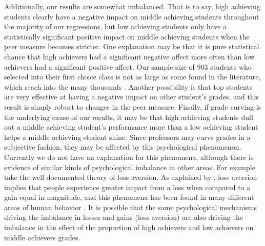 Additionally, our results are somewhat imbalanced. That is to say, high achieving students clearly have a negative impact on middle achieving students throughout the majority of our regressions, but low achieving students only have a statistically significant positive impact on middle achieving students when the peer measure becomes stricter. 
One explanation may be that it is pure statistical chance that high achievers had a significant negative affect more often than low achievers had a significant positive affect. 
Our sample size of 903 students who selected into their first choice class is not as large as some found in the literature, which reach into the many thousands \citep{kang2007classroom,lavy2012good}. 
Another possibility is that top students are very effective at having a negative impact on other student's grades, and this result is simply robust to changes in the peer measure. 
Finally, if grade curving is the underlying cause of our results, it may be that high achieving students dull out a middle achieving student's performance more than a low achieving student helps a middle achieving student shine.
Since professors may curve grades in a subjective fashion, they may be affected by this psychological phenomenon. 
Currently we do not have an explanation for this phenomena, although there is evidence of similar kinds of psychological imbalance in other areas. 
For example take the well documented theory of loss aversion. 
As explained by \citet{tversky1991loss}, loss aversion implies that people experience greater impact from a loss when compared to a gain equal in magnitude, and this phenomena has been found in many different areas of human behavior \citep{shalev2002loss,goette2004loss}. 
It is possible that the same psychological mechanisms driving the imbalance in losses and gains (loss aversion) are also driving the imbalance in the effect of the proportion of high achievers and low achievers on middle achievers grades. 

